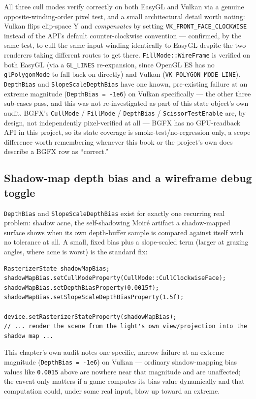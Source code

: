 All three cull modes verify correctly on both EasyGL and Vulkan via a genuine
opposite-winding-order pixel test, and a small architectural detail worth noting: Vulkan
flips clip-space Y and \emph{compensates} by setting \texttt{VK\_FRONT\_FACE\_CLOCKWISE}
instead of the API's default counter-clockwise convention --- confirmed, by the same test, to
cull the same input winding identically to EasyGL despite the two renderers taking different
routes to get there. \texttt{FillMode::WireFrame} is verified on both EasyGL (via a
\texttt{GL\_LINES} re-expansion, since OpenGL ES has no \texttt{glPolygonMode} to fall back
on directly) and Vulkan (\texttt{VK\_POLYGON\_MODE\_LINE}). \texttt{DepthBias} and
\texttt{SlopeScaleDepthBias} have one known, pre-existing failure at an extreme magnitude
(\texttt{DepthBias = -1e6}) on Vulkan specifically --- the other three sub-cases pass, and
this was not re-investigated as part of this state object's own audit. BGFX's
\texttt{CullMode} / \texttt{FillMode} / \texttt{DepthBias} / \texttt{ScissorTestEnable} are, by
design, not independently pixel-verified at all --- BGFX has no GPU-readback API in this
project, so its state coverage is smoke-test/no-regression only, a scope difference worth
remembering whenever this book or the project's own docs describe a BGFX row as
``correct.''

\subsection{Shadow-map depth bias and a wireframe debug toggle}

\texttt{DepthBias} and \texttt{SlopeScaleDepthBias} exist for exactly one recurring real
problem: shadow acne, the self-shadowing Moir\'e artifact a shadow-mapped surface shows when its
own depth-buffer sample is compared against itself with no tolerance at all. A small, fixed bias
plus a slope-scaled term (larger at grazing angles, where acne is worst) is the standard fix:

\begin{lstlisting}
RasterizerState shadowMapBias;
shadowMapBias.setCullModeProperty(CullMode::CullClockwiseFace);
shadowMapBias.setDepthBiasProperty(0.0015f);
shadowMapBias.setSlopeScaleDepthBiasProperty(1.5f);

device.setRasterizerStateProperty(shadowMapBias);
// ... render the scene from the light's own view/projection into the shadow map ...
\end{lstlisting}

This chapter's own audit notes one specific, narrow failure at an extreme magnitude
(\texttt{DepthBias = -1e6}) on Vulkan --- ordinary shadow-mapping bias values like \texttt{0.0015}
above are nowhere near that magnitude and are unaffected; the caveat only matters if a game
computes its bias value dynamically and that computation could, under some real input, blow up
toward an extreme.

